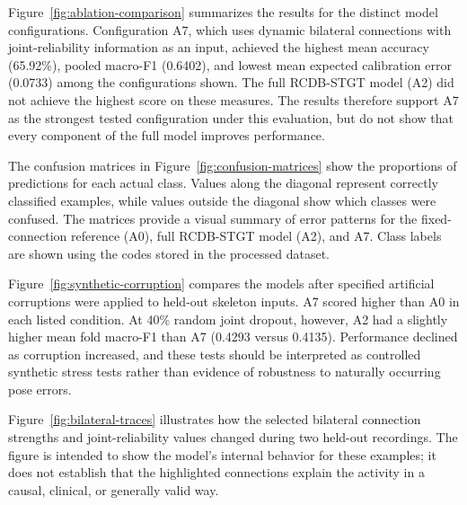
Figure~\ref{fig:ablation-comparison} summarizes the results for the distinct model configurations. Configuration A7, which uses dynamic bilateral connections with joint-reliability information as an input, achieved the highest mean accuracy (65.92\%), pooled macro-F1 (0.6402), and lowest mean expected calibration error (0.0733) among the configurations shown. The full RCDB-STGT model (A2) did not achieve the highest score on these measures. The results therefore support A7 as the strongest tested configuration under this evaluation, but do not show that every component of the full model improves performance.

The confusion matrices in Figure~\ref{fig:confusion-matrices} show the proportions of predictions for each actual class. Values along the diagonal represent correctly classified examples, while values outside the diagonal show which classes were confused. The matrices provide a visual summary of error patterns for the fixed-connection reference (A0), full RCDB-STGT model (A2), and A7. Class labels are shown using the codes stored in the processed dataset.

Figure~\ref{fig:synthetic-corruption} compares the models after specified artificial corruptions were applied to held-out skeleton inputs. A7 scored higher than A0 in each listed condition. At 40\% random joint dropout, however, A2 had a slightly higher mean fold macro-F1 than A7 (0.4293 versus 0.4135). Performance declined as corruption increased, and these tests should be interpreted as controlled synthetic stress tests rather than evidence of robustness to naturally occurring pose errors.

Figure~\ref{fig:bilateral-traces} illustrates how the selected bilateral connection strengths and joint-reliability values changed during two held-out recordings. The figure is intended to show the model's internal behavior for these examples; it does not establish that the highlighted connections explain the activity in a causal, clinical, or generally valid way.
